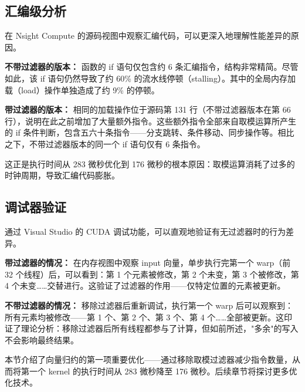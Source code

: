 \subsection{汇编级分析}

在 Nsight Compute 的源码视图中观察汇编代码，可以更深入地理解性能差异的原因。

\textbf{不带过滤器的版本：} 函数的 if 语句仅包含约 6 条汇编指令，结构非常精简。尽管如此，该 if 语句仍然导致了约 60\% 的流水线停顿（stalling）。其中的全局内存加载（load）操作单独造成了约 9\% 的停顿。

\textbf{带过滤器的版本：} 相同的加载操作位于源码第 131 行（不带过滤器版本在第 66 行），说明在此之前增加了大量额外指令。这些额外指令全部来自取模运算所产生的 if 条件判断，包含五六十条指令——分支跳转、条件移动、同步操作等。相比之下，不带过滤器版本的同一个 if 语句仅有 6 条指令。

这正是执行时间从 283 微秒优化到 176 微秒的根本原因：取模运算消耗了过多的时钟周期，导致汇编代码膨胀。

\subsection{调试器验证}

通过 Visual Studio 的 CUDA 调试功能，可以直观地验证有无过滤器时的行为差异。

\textbf{带过滤器的情况：} 在内存视图中观察 input 向量，单步执行完第一个 warp（前 32 个线程）后，可以看到：第 1 个元素被修改，第 2 个未变，第 3 个被修改，第 4 个未变……交替进行。这验证了过滤器的作用——仅特定位置的元素被更新。

\textbf{不带过滤器的情况：} 移除过滤器后重新调试，执行第一个 warp 后可以观察到：所有元素均被修改——第 1 个、第 2 个、第 3 个、第 4 个……全部被更新。这印证了理论分析：移除过滤器后所有线程都参与了计算，但如前所述，"多余"的写入不会影响最终结果。

本节介绍了向量归约的第一项重要优化——通过移除取模过滤器减少指令数量，从而将第一个 kernel 的执行时间从 283 微秒降至 176 微秒。后续章节将探讨更多优化技术。
